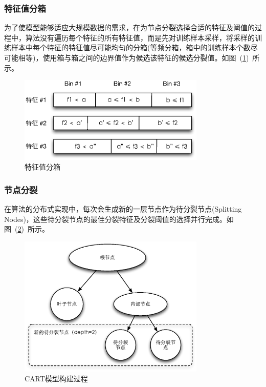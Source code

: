 \documentclass[a4paper,11pt,         %
               ]{article}
\begin{document}
\subsubsection{特征值分箱}

为了使模型能够适应大规模数据的需求，在为节点分裂选择合适的特征及阈值的过程中，算法没有遍历每个特征的所有特征值，而是先对训练样本采样，将采样的训练样本中每个特征的特征值尽可能均匀的分箱(等频分箱，箱中的训练样本个数尽可能相等)，使用箱与箱之间的边界值作为候选该特征的候选分裂值。如图~(\ref{fig:feature_bins})~所示。

\begin{figure}[htbp]
\centering\includegraphics[width=3.5in]{img/feature_bins.eps}
\caption{特征值分箱}\label{fig:feature_bins}
\end{figure}

\subsubsection{节点分裂}

在算法的分布式实现中，每次会生成新的一层节点作为待分裂节点(Splitting Nodes)，这些待分裂节点的最佳分裂特征及分裂阈值的选择并行完成。如图~(\ref{fig:new_splitting_nodes})~所示。

\begin{figure}[htbp]
\centering\includegraphics[width=3.5in]{img/new_splitting_nodes.eps}
\caption{CART模型构建过程}\label{fig:new_splitting_nodes}
\end{figure}
\end{document}
